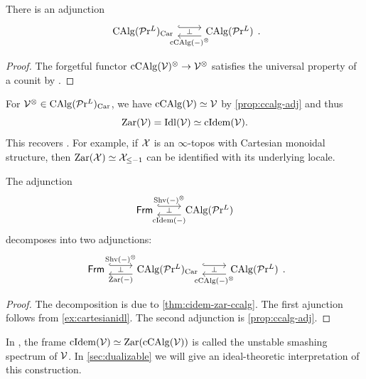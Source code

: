 \documentclass[10pt,a4paper,oneside]{article}
\begin{document}
\begin{prop}\label{prop:ccalg-adj}
There is an adjunction
$$\begin{tikzcd}
\calg(\prl)_{\op{Car}}  \arrow[r, hook, shift right=-1ex]  & \arrow[l,"\perp"', "\op{cCAlg}(-)^\otimes", shift right=-1ex] \calg(\prl) \end{tikzcd}.$$
\end{prop}

\begin{proof}
The forgetful functor $\operatorname{cCAlg}(\mathcal{V})^\otimes\to \mathcal{V}^\otimes$  satisfies the universal property of a counit by \cite[Corollary 2.4.1.8 and Theorem 2.4.3.18]{ha}.
\end{proof}

\begin{ex}\label{ex:cartesianidl}
For $\mathcal{V}^\otimes \in \operatorname{CAlg}(\mathcal{P}\mathrm{r}^L)_{\operatorname{Car}}$, we have $\operatorname{cCAlg}(\mathcal{V}) \simeq \mathcal{V}$ by \cref{prop:ccalg-adj} and thus
\[
\operatorname{Zar}(\mathcal{V})=\operatorname{Idl}(\mathcal{V})\simeq\operatorname{cIdem}(\mathcal{V}).
\]
This recovers \cite[Example~2.12]{aoki2023sheaves}. For example, if $\mathcal{X}$ is an $\infty$-topos with Cartesian monoidal structure, then $\operatorname{Zar}(\mathcal{X})\simeq\mathcal{X}_{\leq -1}$ can be identified with its underlying locale.
\end{ex}

\begin{cor}
The adjunction
$$\begin{tikzcd}
\frm \arrow[r, "\op{Shv}(-)^\otimes", hook, shift right=-1ex]  & \arrow[l,"\perp"', "\cidem(-)", shift right=-1ex] \calg(\prl) \end{tikzcd}$$
decomposes into two adjunctions:
$$\begin{tikzcd}
\frm \arrow[r, "\op{Shv}(-)^\otimes", hook, shift right=-1ex]  & \arrow[l,"\perp"', "\zar(-)", shift right=-1ex] \calg(\prl)_{\op{Car}} \arrow[r, hook, shift right=-1ex]  & \arrow[l,"\perp"', "\op{cCAlg}(-)^\otimes", shift right=-1ex] \calg(\prl) \end{tikzcd}.$$
\end{cor}

\begin{proof}
The decomposition is due to \cref{thm:cidem-zar-ccalg}. The first ajunction follows from \cref{ex:cartesianidl}. The second adjunction is \cref{prop:ccalg-adj}.
\end{proof}

\begin{rem}
In \cite{aoki2023sheaves}, the frame $\operatorname{cIdem}(\mathcal{V})\simeq \operatorname{Zar}(\operatorname{cCAlg}(\mathcal{V}))$ is called the unstable smashing spectrum of $\mathcal{V}$. In \cref{sec:dualizable} we will give an ideal-theoretic interpretation of this construction.
\end{rem}
\end{document}
